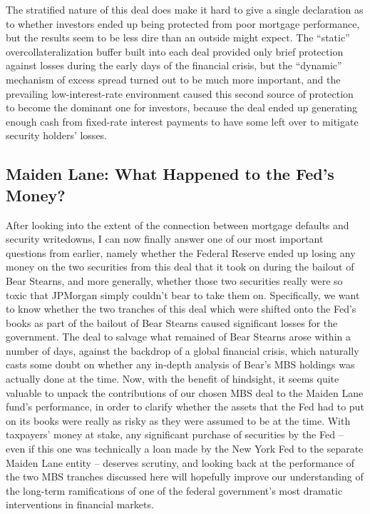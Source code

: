 \documentclass[12pt]{article}
\begin{document}
The stratified nature of this deal does make it hard to give a single declaration as to whether investors ended up being protected from poor mortgage performance, but the results seem to be less dire than an outside might expect. The “static” overcollateralization buffer built into each deal provided only brief protection against losses during the early days of the financial crisis, but the “dynamic” mechanism of excess spread turned out to be much more important, and the prevailing low-interest-rate environment caused this second source of protection to become the dominant one for investors, because the deal ended up generating enough cash from fixed-rate interest payments to have some left over to mitigate security holders’ losses. 

\subsection*{Maiden Lane: What Happened to the Fed's Money?}

After looking into the extent of the connection between mortgage defaults and security writedowns, I can now finally answer one of our most important questions from earlier, namely whether the Federal Reserve ended up losing any money on the two securities from this deal that it took on during the bailout of Bear Stearns, and more generally, whether those two securities really were so toxic that JPMorgan simply couldn’t bear to take them on. Specifically, we want to know whether the two tranches of this deal which were shifted onto the Fed’s books as part of the bailout of Bear Stearns caused significant losses for the government. The deal to salvage what remained of Bear Stearns arose within a number of days, against the backdrop of a global financial crisis, which naturally casts some doubt on whether any in-depth analysis of Bear’s MBS holdings was actually done at the time. Now, with the benefit of hindsight, it seems quite valuable to unpack the contributions of our chosen MBS deal to the Maiden Lane fund’s performance, in order to clarify whether the assets that the Fed had to put on its books were really as risky as they were assumed to be at the time. With taxpayers’ money at stake, any significant purchase of securities by the Fed – even if this one was technically a loan made by the New York Fed to the separate Maiden Lane entity – deserves scrutiny, and looking back at the performance of the two MBS tranches discussed here will hopefully improve our understanding of the long-term ramifications of one of the federal government’s most dramatic interventions in financial markets.
\end{document}
